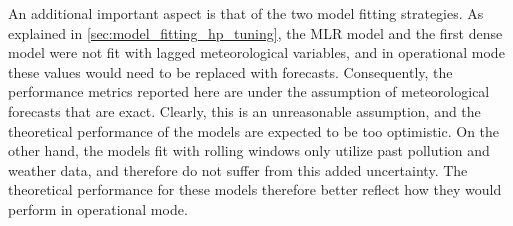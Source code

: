 An additional important aspect is that of the two model fitting strategies. As explained in \cref{sec:model_fitting_hp_tuning}, the MLR model and the first dense model were not fit with lagged meteorological variables, and in operational mode these values would need to be replaced with forecasts. Consequently, the performance metrics reported here are under the assumption of meteorological forecasts that are exact. Clearly, this is an unreasonable assumption, and the theoretical performance of the models are expected to be too optimistic. On the other hand, the models fit with rolling windows only utilize past pollution and weather data, and therefore do not suffer from this added uncertainty. The theoretical performance for these models therefore better reflect how they would perform in operational mode. 



%








%
%
%


